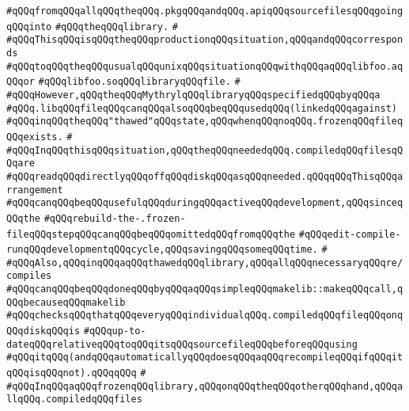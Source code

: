 \verb|#qQQqfromqQQqallqQQqtheqQQq.pkgqQQqandqQQq.apiqQQqsourcefilesqQQqgoingqQQqinto|\newline
\verb|#qQQqtheqQQqlibrary.|\newline
\verb|#|\newline
\verb|#qQQqThisqQQqisqQQqtheqQQqproductionqQQqsituation,qQQqandqQQqcorresponds|\newline
\verb|#qQQqtoqQQqtheqQQqusualqQQqunixqQQqsituationqQQqwithqQQqaqQQqlibfoo.aqQQqor|\newline
\verb|#qQQqlibfoo.soqQQqlibraryqQQqfile.|\newline
\verb|#|\newline
\verb|#qQQqHowever,qQQqtheqQQqMythrylqQQqlibraryqQQqspecifiedqQQqbyqQQqa|\newline
\verb|#qQQq.libqQQqfileqQQqcanqQQqalsoqQQqbeqQQqusedqQQq(linkedqQQqagainst)|\newline
\verb|#qQQqinqQQqtheqQQq"thawed"qQQqstate,qQQqwhenqQQqnoqQQq.frozenqQQqfileqQQqexists.|\newline
\verb|#|\newline
\verb|#qQQqInqQQqthisqQQqsituation,qQQqtheqQQqneededqQQq.compiledqQQqfilesqQQqare|\newline
\verb|#qQQqreadqQQqdirectlyqQQqoffqQQqdiskqQQqasqQQqneeded.qQQqqQQqThisqQQqarrangement|\newline
\verb|#qQQqcanqQQqbeqQQqusefulqQQqduringqQQqactiveqQQqdevelopment,qQQqsinceqQQqthe|\newline
\verb|#qQQqrebuild-the-.frozen-fileqQQqstepqQQqcanqQQqbeqQQqomittedqQQqfromqQQqthe|\newline
\verb|#qQQqedit-compile-runqQQqdevelopmentqQQqcycle,qQQqsavingqQQqsomeqQQqtime.|\newline
\verb|#|\newline
\verb|#qQQqAlso,qQQqinqQQqaqQQqthawedqQQqlibrary,qQQqallqQQqnecessaryqQQqre/compiles|\newline
\verb|#qQQqcanqQQqbeqQQqdoneqQQqbyqQQqaqQQqsimpleqQQqmakelib::makeqQQqcall,qQQqbecauseqQQqmakelib|\newline
\verb|#qQQqchecksqQQqthatqQQqeveryqQQqindividualqQQq.compiledqQQqfileqQQqonqQQqdiskqQQqis|\newline
\verb|#qQQqup-to-dateqQQqrelativeqQQqtoqQQqitsqQQqsourcefileqQQqbeforeqQQqusing|\newline
\verb|#qQQqitqQQq(andqQQqautomaticallyqQQqdoesqQQqaqQQqrecompileqQQqifqQQqitqQQqisqQQqnot).qQQqqQQq|\newline
\verb|#|\newline
\verb|#qQQqInqQQqaqQQqfrozenqQQqlibrary,qQQqonqQQqtheqQQqotherqQQqhand,qQQqallqQQq.compiledqQQqfiles|\newline
